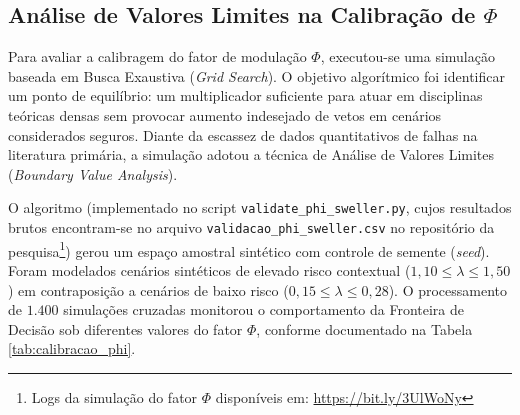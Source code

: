 
\subsection{Análise de Valores Limites na Calibração de $\Phi$}

Para avaliar a calibragem do fator de modulação $\Phi$, executou-se uma simulação baseada em Busca Exaustiva (\textit{Grid Search}). O objetivo algorítmico foi identificar um ponto de equilíbrio: um multiplicador suficiente para atuar em disciplinas teóricas densas sem provocar aumento indesejado de vetos em cenários considerados seguros. Diante da escassez de dados quantitativos de falhas na literatura primária, a simulação adotou a técnica de Análise de Valores Limites (\textit{Boundary Value Analysis}).

O algoritmo (implementado no script \texttt{validate\_phi\_sweller.py}, cujos resultados brutos encontram-se no arquivo \texttt{validacao\_phi\_sweller.csv} no repositório da pesquisa\footnote{Logs da simulação do fator $\Phi$ disponíveis em: \url{https://bit.ly/3UlWoNy}}) gerou um espaço amostral sintético com controle de semente (\textit{seed}). Foram modelados cenários sintéticos de elevado risco contextual ($1,10 \le \lambda \le 1,50$) em contraposição a cenários de baixo risco ($0,15 \le \lambda \le 0,28$). O processamento de $1.400$ simulações cruzadas monitorou o comportamento da Fronteira de Decisão sob diferentes valores do fator $\Phi$, conforme documentado na Tabela \ref{tab:calibracao_phi}.

\begin{table}[htpb]
\centering
\caption{Avaliação computacional do Fator $\Phi$ sob variação de carga cognitiva.}
\label{tab:calibracao_phi}
\end{table}

